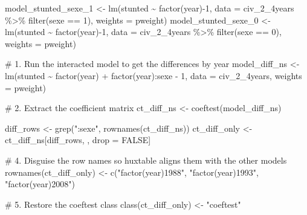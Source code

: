 \documentclass[
  letterpaper,
  DIV=11,
  numbers=noendperiod]{scrartcl}
\newenvironment{Shaded}{\begin{snugshade}}{\end{snugshade}}
\newcommand{\AttributeTok}[1]{\textcolor[rgb]{0.40,0.45,0.13}{#1}}
\newcommand{\CommentTok}[1]{\textcolor[rgb]{0.37,0.37,0.37}{#1}}
\newcommand{\ConstantTok}[1]{\textcolor[rgb]{0.56,0.35,0.01}{#1}}
\newcommand{\DecValTok}[1]{\textcolor[rgb]{0.68,0.00,0.00}{#1}}
\newcommand{\FunctionTok}[1]{\textcolor[rgb]{0.28,0.35,0.67}{#1}}
\newcommand{\NormalTok}[1]{\textcolor[rgb]{0.00,0.23,0.31}{#1}}
\newcommand{\OtherTok}[1]{\textcolor[rgb]{0.00,0.23,0.31}{#1}}
\newcommand{\SpecialCharTok}[1]{\textcolor[rgb]{0.37,0.37,0.37}{#1}}
\newcommand{\StringTok}[1]{\textcolor[rgb]{0.13,0.47,0.30}{#1}}
\begin{document}
\begin{Shaded}
\begin{Highlighting}[]
\NormalTok{model\_stunted\_sexe\_1 }\OtherTok{\textless{}{-}} \FunctionTok{lm}\NormalTok{(stunted }\SpecialCharTok{\textasciitilde{}} \FunctionTok{factor}\NormalTok{(year)}\SpecialCharTok{{-}}\DecValTok{1}\NormalTok{, }\AttributeTok{data =}\NormalTok{ civ\_2\_4years }\SpecialCharTok{\%\textgreater{}\%} \FunctionTok{filter}\NormalTok{(sexe }\SpecialCharTok{==} \DecValTok{1}\NormalTok{), }\AttributeTok{weights =}\NormalTok{ pweight)}
\NormalTok{model\_stunted\_sexe\_0 }\OtherTok{\textless{}{-}} \FunctionTok{lm}\NormalTok{(stunted }\SpecialCharTok{\textasciitilde{}} \FunctionTok{factor}\NormalTok{(year)}\SpecialCharTok{{-}}\DecValTok{1}\NormalTok{, }\AttributeTok{data =}\NormalTok{ civ\_2\_4years }\SpecialCharTok{\%\textgreater{}\%} \FunctionTok{filter}\NormalTok{(sexe }\SpecialCharTok{==} \DecValTok{0}\NormalTok{), }\AttributeTok{weights =}\NormalTok{ pweight)}

\CommentTok{\# 1. Run the interacted model to get the differences by year}
\NormalTok{model\_diff\_ns }\OtherTok{\textless{}{-}} \FunctionTok{lm}\NormalTok{(stunted }\SpecialCharTok{\textasciitilde{}} \FunctionTok{factor}\NormalTok{(year) }\SpecialCharTok{+} \FunctionTok{factor}\NormalTok{(year)}\SpecialCharTok{:}\NormalTok{sexe }\SpecialCharTok{{-}} \DecValTok{1}\NormalTok{, }\AttributeTok{data =}\NormalTok{ civ\_2\_4years, }\AttributeTok{weights =}\NormalTok{ pweight)}

\CommentTok{\# 2. Extract the coefficient matrix}
\NormalTok{ct\_diff\_ns }\OtherTok{\textless{}{-}} \FunctionTok{coeftest}\NormalTok{(model\_diff\_ns)}

\NormalTok{diff\_rows }\OtherTok{\textless{}{-}} \FunctionTok{grep}\NormalTok{(}\StringTok{":sexe"}\NormalTok{, }\FunctionTok{rownames}\NormalTok{(ct\_diff\_ns))}
\NormalTok{ct\_diff\_only }\OtherTok{\textless{}{-}}\NormalTok{ ct\_diff\_ns[diff\_rows, , drop }\OtherTok{=} \ConstantTok{FALSE}\NormalTok{]}

\CommentTok{\# 4. Disguise the row names so huxtable aligns them with the other models}
\FunctionTok{rownames}\NormalTok{(ct\_diff\_only) }\OtherTok{\textless{}{-}} \FunctionTok{c}\NormalTok{(}\StringTok{"factor(year)1988"}\NormalTok{, }\StringTok{"factor(year)1993"}\NormalTok{, }\StringTok{"factor(year)2008"}\NormalTok{)}

\CommentTok{\# 5. Restore the coeftest class}
\FunctionTok{class}\NormalTok{(ct\_diff\_only) }\OtherTok{\textless{}{-}} \StringTok{"coeftest"}


\end{Highlighting}
\end{Shaded}
\end{document}
